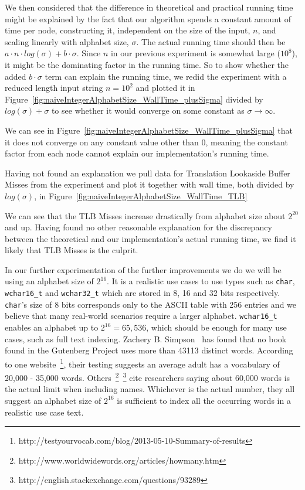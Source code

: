 We then considered that the difference in theoretical and practical running time might be explained by the fact that our algorithm spends a constant amount of time per node, constructing it, independent on the size of the input, $n$, and scaling linearly with alphabet size, $\sigma$.
The actual running time should then be $a \cdot n \cdot log(\sigma) + b \cdot \sigma$.
Since $n$ in our previous experiment is somewhat large ($10^8$), it might be the dominating factor in the running time.
So to show whether the added $b \cdot \sigma$ term can explain the running time, we redid the experiment with a reduced length input string $n = 10^2$ and plotted it in Figure~\ref{fig:naiveIntegerAlphabetSize_WallTime_plusSigma} divided by $log(\sigma) + \sigma$ to see whether it would converge on some constant as $\sigma \rightarrow \infty$.

We can see in Figure~\ref{fig:naiveIntegerAlphabetSize_WallTime_plusSigma} that it does not converge on any constant value other than 0, meaning the constant factor from each node cannot explain our implementation's running time.

Having not found an explanation we pull data for Translation Lookaside Buffer Misses from the experiment and plot it together with wall time, both divided by $log(\sigma)$, in Figure~\ref{fig:naiveIntegerAlphabetSize_WallTime_TLB}




We can see that the TLB Misses increase drastically from alphabet size about $2^{20}$ and up.
Having found no other reasonable explanation for the discrepancy between the theoretical and our implementation's actual running time, we find it likely that TLB Misses is the culprit.

In our further experimentation of the further improvements we do we will be using an alphabet size of $2^{16}$.
It is a realistic use cases to use types such as \texttt{char}, \texttt{wchar16\_t} and \texttt{wchar32\_t} which are stored in 8, 16 and 32 bits respectively.
\texttt{char}'s size of 8 bits corresponds only to the ASCII table with 256 entries and we believe that many real-world scenarios require a larger alphabet.
\texttt{wchar16\_t} enables an alphabet up to $2^{16} = 65,536$, which should be enough for many use cases, such as full text indexing.
Zachery B. Simpson~\citep{bookWordStatistics} has found that no book found in the Gutenberg Project uses more than 43113 distinct words.
According to one website~\footnote{http://testyourvocab.com/blog/2013-05-10-Summary-of-results}, their testing suggests an average adult has a vocabulary of 20,000 - 35,000 words. 
Others~\footnote{http://www.worldwidewords.org/articles/howmany.htm}~\footnote{http://english.stackexchange.com/questions/93289} cite researchers saying about 60,000 words is the actual limit when including names.
Whichever is the actual number, they all suggest an alphabet size of $2^{16}$ is sufficient to index all the occurring words in a realistic use case text.

